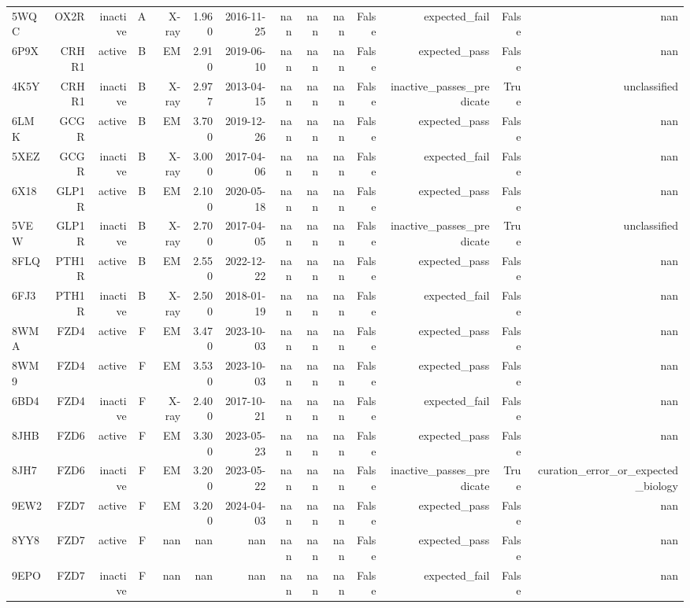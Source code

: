 \begin{longtable}{lrrrrrrrrrrrrr}
5WQC & OX2R & inactive & A & X-ray & 1.960 & 2016-11-25 & nan & nan & nan & False & expected\_fail & False & nan \\
6P9X & CRHR1 & active & B & EM & 2.910 & 2019-06-10 & nan & nan & nan & False & expected\_pass & False & nan \\
4K5Y & CRHR1 & inactive & B & X-ray & 2.977 & 2013-04-15 & nan & nan & nan & False & inactive\_passes\_predicate & True & unclassified \\
6LMK & GCGR & active & B & EM & 3.700 & 2019-12-26 & nan & nan & nan & False & expected\_pass & False & nan \\
5XEZ & GCGR & inactive & B & X-ray & 3.000 & 2017-04-06 & nan & nan & nan & False & expected\_fail & False & nan \\
6X18 & GLP1R & active & B & EM & 2.100 & 2020-05-18 & nan & nan & nan & False & expected\_pass & False & nan \\
5VEW & GLP1R & inactive & B & X-ray & 2.700 & 2017-04-05 & nan & nan & nan & False & inactive\_passes\_predicate & True & unclassified \\
8FLQ & PTH1R & active & B & EM & 2.550 & 2022-12-22 & nan & nan & nan & False & expected\_pass & False & nan \\
6FJ3 & PTH1R & inactive & B & X-ray & 2.500 & 2018-01-19 & nan & nan & nan & False & expected\_fail & False & nan \\
8WMA & FZD4 & active & F & EM & 3.470 & 2023-10-03 & nan & nan & nan & False & expected\_pass & False & nan \\
8WM9 & FZD4 & active & F & EM & 3.530 & 2023-10-03 & nan & nan & nan & False & expected\_pass & False & nan \\
6BD4 & FZD4 & inactive & F & X-ray & 2.400 & 2017-10-21 & nan & nan & nan & False & expected\_fail & False & nan \\
8JHB & FZD6 & active & F & EM & 3.300 & 2023-05-23 & nan & nan & nan & False & expected\_pass & False & nan \\
8JH7 & FZD6 & inactive & F & EM & 3.200 & 2023-05-22 & nan & nan & nan & False & inactive\_passes\_predicate & True & curation\_error\_or\_expected\_biology \\
9EW2 & FZD7 & active & F & EM & 3.200 & 2024-04-03 & nan & nan & nan & False & expected\_pass & False & nan \\
8YY8 & FZD7 & active & F & nan & nan & nan & nan & nan & nan & False & expected\_pass & False & nan \\
9EPO & FZD7 & inactive & F & nan & nan & nan & nan & nan & nan & False & expected\_fail & False & nan \\

\end{longtable}
